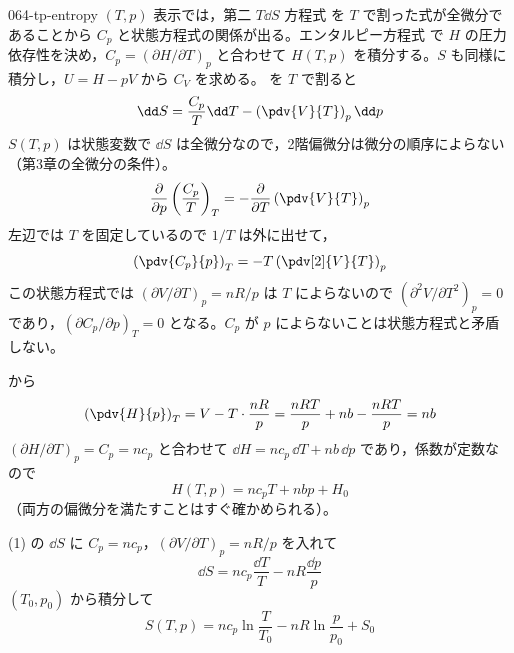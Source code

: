 \documentclass[uplatex,dvipdfmx,a4paper,11pt]{jsarticle}
\begin{document}
\begin{kaisetsu}{064-tp-entropy}
\houshin $(T,p)$ 表示では，第二 $T\dd S$ 方程式  を $T$ で割った式が全微分であることから $C_{p}$ と状態方程式の関係が出る。エンタルピー方程式  で $H$ の圧力依存性を決め，$C_{p} = (\partial H/\partial T)_{p}$ と合わせて $H(T,p)$ を積分する。$S$ も同様に積分し，$U = H - pV$ から $C_{V}$ を求める。
\keisan {}  を $T$ で割ると
\[ \dd S = \frac{C_{p}}{T}\dd T - \left(\pdv{V}{T}\right)_{p}\dd p \]
$S(T,p)$ は状態変数で $\dd S$ は全微分なので，2階偏微分は微分の順序によらない（第3章の全微分の条件）。
\[ \frac{\partial}{\partial p}\left(\frac{C_{p}}{T}\right)_{T} = -\frac{\partial}{\partial T}\left(\pdv{V}{T}\right)_{p} \]
左辺では $T$ を固定しているので $1/T$ は外に出せて，
\[ \left(\pdv{C_{p}}{p}\right)_{T} = -T\left(\pdv[2]{V}{T}\right)_{p} \]
この状態方程式では $(\partial V/\partial T)_{p} = nR/p$ は $T$ によらないので $(\partial^{2}V/\partial T^{2})_{p} = 0$ であり，$(\partial C_{p}/\partial p)_{T} = 0$ となる。$C_{p}$ が $p$ によらないことは状態方程式と矛盾しない。

  から
\[ \left(\pdv{H}{p}\right)_{T} = V - T\cdot\frac{nR}{p} = \frac{nRT}{p} + nb - \frac{nRT}{p} = nb \]
$(\partial H/\partial T)_{p} = C_{p} = nc_{p}$ と合わせて $\dd H = nc_{p}\,\dd T + nb\,\dd p$ であり，係数が定数なので
\[ H(T,p) = nc_{p}T + nbp + H_{0} \]
（両方の偏微分を満たすことはすぐ確かめられる）。

 (1) の $\dd S$ に $C_{p} = nc_{p}$，$(\partial V/\partial T)_{p} = nR/p$ を入れて
\[ \dd S = nc_{p}\frac{\dd T}{T} - nR\frac{\dd p}{p} \]
$(T_{0},p_{0})$ から積分して
\[ S(T,p) = nc_{p}\ln\frac{T}{T_{0}} - nR\ln\frac{p}{p_{0}} + S_{0} \]


\end{kaisetsu}
\end{document}
